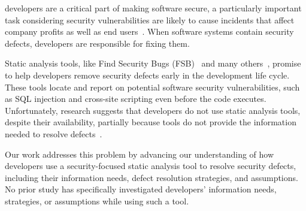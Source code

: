 \documentclass[10pt,journal,compsoc]{IEEEtran}
\begin{document}
 developers are a critical part of making software secure, a particularly important task considering security vulnerabilities are likely to cause incidents that affect company profits as well as end users~\cite{chen2002mops}.
When software systems contain security defects, developers are responsible for fixing them. 

Static analysis tools, like Find Security Bugs (FSB)~\cite{FindSecurityBugs} and many others~\cite{CodeAnalysis, OWASPSCA, SecurityAnalyzers, CodeSonar, Coverity}, promise to help developers remove security defects early in the development life cycle.
These tools locate and report on potential software security vulnerabilities, such as SQL injection and cross-site scripting even before the code executes.  
Unfortunately, research suggests that developers do not use static analysis tools, despite their availability, partially because tools do not provide the information needed to resolve defects~\cite{johnson2013don}. 


%

Our work addresses this problem by advancing our understanding of how developers use a security-focused static analysis tool to resolve security defects, including their information needs, defect resolution strategies, and assumptions.
No prior study has specifically investigated developers' information needs, strategies, or assumptions while using such a tool. 
\end{document}
